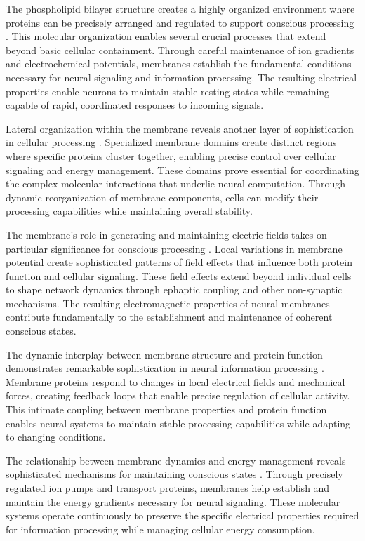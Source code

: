 \begin{refsection}
The phospholipid bilayer structure creates a highly organized environment where proteins can be precisely arranged and regulated to support conscious processing \cite{Goni2014}. This molecular organization enables several crucial processes that extend beyond basic cellular containment. Through careful maintenance of ion gradients and electrochemical potentials, membranes establish the fundamental conditions necessary for neural signaling and information processing. The resulting electrical properties enable neurons to maintain stable resting states while remaining capable of rapid, coordinated responses to incoming signals.

Lateral organization within the membrane reveals another layer of sophistication in cellular processing \cite{Garcia-Parajo2014}. Specialized membrane domains create distinct regions where specific proteins cluster together, enabling precise control over cellular signaling and energy management. These domains prove essential for coordinating the complex molecular interactions that underlie neural computation. Through dynamic reorganization of membrane components, cells can modify their processing capabilities while maintaining overall stability.

The membrane's role in generating and maintaining electric fields takes on particular significance for conscious processing \cite{Bezanilla2002}. Local variations in membrane potential create sophisticated patterns of field effects that influence both protein function and cellular signaling. These field effects extend beyond individual cells to shape network dynamics through ephaptic coupling and other non-synaptic mechanisms. The resulting electromagnetic properties of neural membranes contribute fundamentally to the establishment and maintenance of coherent conscious states.

The dynamic interplay between membrane structure and protein function demonstrates remarkable sophistication in neural information processing \cite{Kusumi2012}. Membrane proteins respond to changes in local electrical fields and mechanical forces, creating feedback loops that enable precise regulation of cellular activity. This intimate coupling between membrane properties and protein function enables neural systems to maintain stable processing capabilities while adapting to changing conditions.

The relationship between membrane dynamics and energy management reveals sophisticated mechanisms for maintaining conscious states \cite{Yang2019}. Through precisely regulated ion pumps and transport proteins, membranes help establish and maintain the energy gradients necessary for neural signaling. These molecular systems operate continuously to preserve the specific electrical properties required for information processing while managing cellular energy consumption.


\end{refsection}
